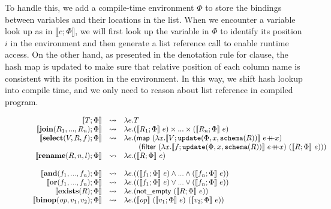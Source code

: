 To handle this, we add a compile-time environment $\Phi$ to store the bindings between variables and their locations in the  list. When we encounter a variable look up as in $\llbracket \mathit{c};\Phi \rrbracket $, we will first look up the variable in $\Phi$ to identify its position $i$ in the environment and then generate a list reference call  to enable runtime access. On the other hand, as presented in the denotation rule for  clause, the hash map is updated to make sure that relative position of each column name is consistent with its position in the environment. In this way, we shift hash lookup into compile time, and we only need to reason about list reference in compiled program.

\begin{figure}[ht]
\[
\begin{array}{rcl}
 \llbracket T; \Phi  \rrbracket& \leadsto& \lambda e.T\\
\llbracket \mathbf{join}(R_1,...,R_n);\Phi \rrbracket &\leadsto& \lambda e.(\llbracket R_1; \Phi\rrbracket~e)\times...\times(\llbracket R_n;\Phi\rrbracket~e)\\
\llbracket \mathbf{select}(V, R, f);\Phi \rrbracket &\leadsto& \lambda e. (\mathsf{map}~(\lambda x.\llbracket V;\mathtt{update}(\Phi, x, \mathtt{schema}(R)) \rrbracket~ e\concat x)\\
& & \qquad(\mathsf{filter}~(\lambda x.\llbracket f; \mathtt{update}(\Phi, x,\mathtt{schema}(R))\rrbracket~e\concat x)~ (\llbracket R;\Phi \rrbracket~e)))\\
\llbracket \mathbf{rename}(R, n, l);\Phi \rrbracket &\leadsto& \lambda e.(\llbracket R; \Phi\rrbracket~e)\\
\\
 \llbracket \mathbf{and}(f_1,...,f_n);\Phi \rrbracket &\leadsto& \lambda e.((\llbracket f_1;\Phi \rrbracket~e) \land ... \land (\llbracket f_n;\Phi \rrbracket~e))\\
\llbracket \mathbf{or}(f_1,...,f_n);\Phi \rrbracket &\leadsto& \lambda e.((\llbracket f_1;\Phi \rrbracket~e) \lor ... \lor (\llbracket f_n;\Phi \rrbracket~e))\\
\llbracket\mathbf{exists}(R);\Phi \rrbracket &\leadsto& \lambda e. (\mathsf{not\_empty}~(\llbracket R;\Phi \rrbracket~e))\\
\llbracket \mathbf{binop}(\mathit{op}, v_1, v_2);\Phi\rrbracket &\leadsto&  \lambda e.(\llbracket \mathit{op} \rrbracket~(\llbracket v_1;\Phi \rrbracket~e)~(\llbracket v_2;\Phi \rrbracket~e))\\

\end{array}\]
\end{figure}
